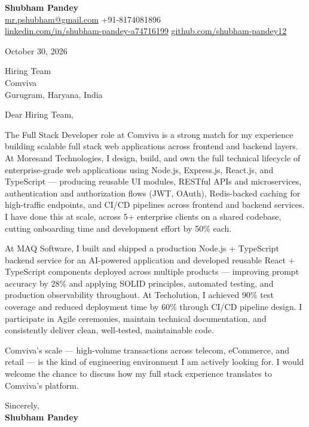 \documentclass[a4paper,11pt]{article}
\begin{document}
\textbf{\Large Shubham Pandey}\\
\href{mailto:mr.pshubham@gmail.com}{mr.pshubham@gmail.com} \quad +91-8174081896\\
\href{https://www.linkedin.com/in/shubham-pandey-a74716199/}{linkedin.com/in/shubham-pandey-a74716199} \quad
\href{https://github.com/shubham-pandey12}{github.com/shubham-pandey12}

\vspace{1em}
October 30, 2026

\vspace{1em}
Hiring Team\\
Comviva\\
Gurugram, Haryana, India

\vspace{1em}
Dear Hiring Team,

The Full Stack Developer role at Comviva is a strong match for my experience building scalable full stack web applications across frontend and backend layers. At Moresand Technologies, I design, build, and own the full technical lifecycle of enterprise-grade web applications using Node.js, Express.js, React.js, and TypeScript --- producing reusable UI modules, RESTful APIs and microservices, authentication and authorization flows (JWT, OAuth), Redis-backed caching for high-traffic endpoints, and CI/CD pipelines across frontend and backend services. I have done this at scale, across 5+ enterprise clients on a shared codebase, cutting onboarding time and development effort by 50\% each.

At MAQ Software, I built and shipped a production Node.js + TypeScript backend service for an AI-powered application and developed reusable React + TypeScript components deployed across multiple products --- improving prompt accuracy by 28\% and applying SOLID principles, automated testing, and production observability throughout. At Techolution, I achieved 90\% test coverage and reduced deployment time by 60\% through CI/CD pipeline design. I participate in Agile ceremonies, maintain technical documentation, and consistently deliver clean, well-tested, maintainable code.

Comviva's scale --- high-volume transactions across telecom, eCommerce, and retail --- is the kind of engineering environment I am actively looking for. I would welcome the chance to discuss how my full stack experience translates to Comviva's platform.

\vspace{1em}
Sincerely,\\[0.5em]
\textbf{Shubham Pandey}
\end{document}
